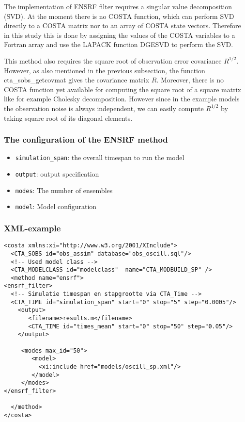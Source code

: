 \documentclass[a4paper,12pt]{article}
\begin{document}
         The implementation of ENSRF filter requires a singular value
         decomposition (SVD). At the moment there is no COSTA function, which
         can perform SVD directly to a COSTA matrix nor to an array of COSTA
         state vectors. Therefore in this study this is done by assigning the
         values of the COSTA variables to a Fortran array and use the LAPACK
         function DGESVD to perform the SVD.

         This method also requires the square root of observation error
         covariance $R^{1/2}$. However, as also mentioned in the previous
         subsection, the function cta\_sobs\_getcovmat gives the covariance
         matrix $R$. Moreover, there is no COSTA function yet available for
         computing the square root of a square matrix like for example Cholesky
         decomposition. However since in the example models the observation
         noise is always independent, we can easily compute $R^{1/2}$ by taking
         square root of its diagonal elements.

\subsubsection{The configuration of the ENSRF method}
\begin{itemize}
\item {\tt simulation\_span}: the overall timespan to run the model
\item {\tt output}: output specification
\item {\tt modes}: The number of ensembles
\item {\tt model}: Model configuration
\end{itemize}

\subsubsection{XML-example}
 \begin{verbatim}
<costa xmlns:xi="http://www.w3.org/2001/XInclude">
  <CTA_SOBS id="obs_assim" database="obs_oscill.sql"/>
  <!-- Used model class -->
  <CTA_MODELCLASS id="modelclass"  name="CTA_MODBUILD_SP" />
  <method name="ensrf"> 
<ensrf_filter>
  <!-- Simulatie timespan en stapgrootte via CTA_Time -->
  <CTA_TIME id="simulation_span" start="0" stop="5" step="0.0005"/>
    <output>
       <filename>results.m</filename>
       <CTA_TIME id="times_mean" start="0" stop="50" step="0.05"/>
    </output>

     <modes max_id="50">
        <model>
          <xi:include href="models/oscill_sp.xml"/>
        </model>        
     </modes>
</ensrf_filter>
  
  </method> 
</costa>
 \end{verbatim}
\end{document}
